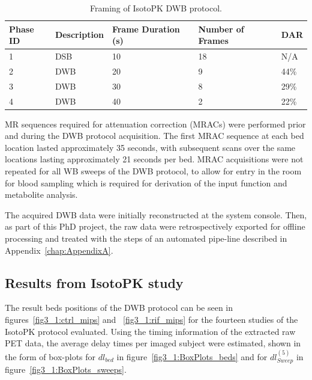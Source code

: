 \begin{table}[]
\caption{Framing of IsotoPK DWB protocol.}
\label{tab:IsotoPK_Framing}
\begin{tabular}{|l|l|l|l|l|}
\toprule
\textbf{Phase ID} & \textbf{Description}              & \textbf{Frame Duration (s)} & \textbf{Number of Frames} & \textbf{DAR} \\
\midrule
1        & DSB & 10                 & 18        & N/A                 \\
2        & DWB                      & 20                 & 9         & 44\%                \\
3        & DWB                      & 30                 & 8         & 29\%                \\
4        & DWB                      & 40                 & 2         & 22\%                \\
\bottomrule
\end{tabular}
\end{table}

MR sequences required for attenuation correction (MRACs) were performed prior and during the DWB protocol acquisition. The first MRAC sequence at each bed location lasted approximately 35 seconds, with subsequent scans over the same locations lasting approximately 21 seconds per bed. MRAC acquisitions were not repeated for all WB sweeps of the DWB protocol, to allow for entry in the room for blood sampling which is required for derivation of the input function and metabolite analysis. 

The acquired DWB data were initially reconstructed at the system console.
Then, as part of this PhD project, the raw data were retrospectively exported for offline processing and treated with the steps of an automated pipe-line described in Appendix~\ref{chap:AppendixA}.

\subsection{Results from IsotoPK study}

The result beds positions of the DWB protocol can be seen in figures~\ref{fig3_1:ctrl_mips} and ~\ref{fig3_1:rif_mips} for the fourteen studies of the IsotoPK protocol evaluated.
Using the timing information of the extracted raw PET data, the average delay times per imaged subject were estimated, shown in the form of box-plots for $dl_{bed}$ in figure~\ref{fig3_1:BoxPlots_beds} and for $dl_{Sweep}^{(5)}$ in figure~\ref{fig3_1:BoxPlots_sweeps}.

